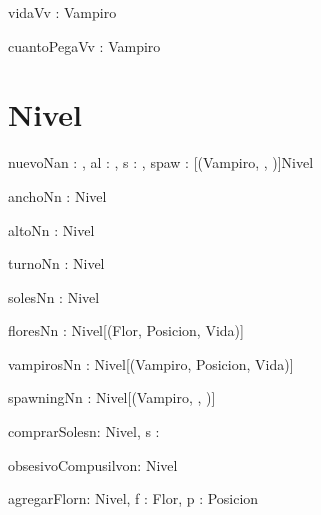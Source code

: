 \documentclass[spanish,a4paper]{article}
\begin{document}
\begin{problema}{vidaV}{v : Vampiro}{\ent}
\end{problema}

\begin{problema}{cuantoPegaV}{v : Vampiro}{\ent}
\end{problema}


\section{Nivel}


\begin{problema}{nuevoN}{an : \ent, al : \ent, s : \ent, spaw : [(Vampiro, \ent, \ent)]}{Nivel}
\end{problema}

\begin{problema}{anchoN}{n : Nivel}{\ent}
\end{problema}

\begin{problema}{altoN}{n : Nivel}{\ent}
\end{problema}


\begin{problema}{turnoN}{n : Nivel}{\ent}
\end{problema}

\begin{problema}{solesN}{n : Nivel}{\ent}
\end{problema}

\begin{problema}{floresN}{n : Nivel}{[(Flor, Posicion, Vida)]}
\end{problema}

\begin{problema}{vampirosN}{n : Nivel}{[(Vampiro, Posicion, Vida)]}
\end{problema}

\begin{problema}{spawningN}{n : Nivel}{[(Vampiro, \ent, \ent)]}
\end{problema}

\begin{problema}{comprarSoles}{n: Nivel, s : \ent}{}
\end{problema}

\begin{problema}{obsesivoCompusilvo}{n: Nivel}{\bool}
\end{problema}

\begin{problema}{agregarFlor}{n: Nivel, f : Flor, p : Posicion}{}
\end{problema}
\end{document}
